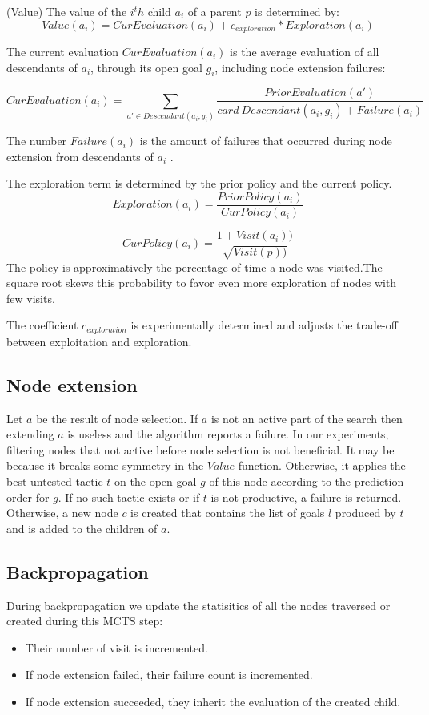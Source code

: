 \documentclass[runningheads,a4paper,draft]{svjour3}
\begin{document}
\begin{definition}\label{def:value}(Value)
The value of the $i^th$ child $a_i$ of a parent $p$ is determined by:
\[Value(a_i) = CurEvaluation(a_i) + c_{exploration} * Exploration(a_i)\] 

The current evaluation $CurEvaluation(a_i)$ is the average evaluation of 
all descendants of $a_i$, through its open goal $g_i$, including node extension 
failures:

\[CurEvaluation(a_i) = 
  \sum_{a' \in Descendant(a_i,g_i)} \frac{PriorEvaluation(a')} {card\ 
  Descendant(a_i,g_i) + Failure(a_i)}\]

The number $Failure(a_i)$ is the amount of failures that occurred during node 
extension from descendants of $a_i$ .

The exploration term is determined by the prior policy and the current policy.
\[Exploration(a_i) = \frac{PriorPolicy(a_i)}{CurPolicy(a_i)}\]

\[CurPolicy(a_i) = \frac{1 + Visit(a_i))}{\sqrt{Visit(p))}}\]
The policy is approximatively the  percentage of time a node was visited.The 
square root skews this probability to favor even more exploration of nodes with 
few visits. 

The coefficient $c_{exploration}$ is experimentally determined and adjusts the 
trade-off between exploitation and exploration.
\end{definition}

\subsection{Node extension}
Let $a$ be the result of node selection.
If $a$ is not an active part of the search then extending $a$ is useless and 
the algorithm reports a failure. In our experiments, filtering nodes that not 
active before node selection is 
not beneficial. It may be because it breaks some symmetry in the 
$Value$ function. 
Otherwise, it applies the best untested tactic $t$ on the open goal $g$ of this 
node according to the prediction order for $g$. If no such tactic exists or if 
$t$ is not productive, a failure is returned. 
Otherwise, a new node $c$ is created that contains the list of goals $l$ 
produced by $t$ and is added to the children of $a$.
 

\subsection{Backpropagation}
During backpropagation we update the statisitics of all the nodes traversed or 
created during this MCTS step:
\begin{itemize}
\item Their number of visit is incremented.
\item If node extension failed, their failure count is incremented.
\item If node extension succeeded, they inherit the evaluation of the created 
child. 
\end{itemize}
\end{document}
